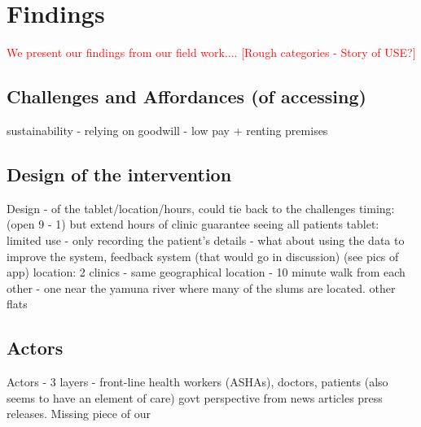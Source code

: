 \section{Findings}
\begin{comment}
This will form the chunk of your writing. I have sometimes iterated through these in written form, or else made a rough outline  on paper and then put it down. It is best that we talk about this section before you attempt to write. Depending on the structure of this section, you might label the section Findings or Analysis. The thing to remember is that all of your data goes into this section, and you need to weave a story around your data that is compelling, novel, and forms the central theme of the paper. If you have done qualitative work, make sure you include these quotes in the findings. Most importantly, do not tell a story based on quotes you have. Pick quotes based on the story you want to tell.

STORY OF USE
\end{comment}
\textcolor{red}{We present our findings from our field work.... [Rough categories - Story of USE?]}

\subsection{Challenges and Affordances (of accessing)}
sustainability - relying on goodwill - low pay + renting premises

\subsection{Design of the intervention}
Design - of the tablet/location/hours, could tie back to the challenges
timing: (open 9 - 1) but extend hours of clinic
guarantee seeing all patients
tablet: limited use - only recording the patient's details - what about using the data to improve the system, feedback system (that would go in discussion) (see pics of app)
location: 2 clinics - same geographical location - 10 minute walk from each other - one near the yamuna river where many of the slums are located. other flats

\subsection{Actors}
Actors - 3 layers - front-line health workers (ASHAs), doctors, patients (also seems to have an element of care)
govt perspective from news articles press releases. Missing piece of our 


